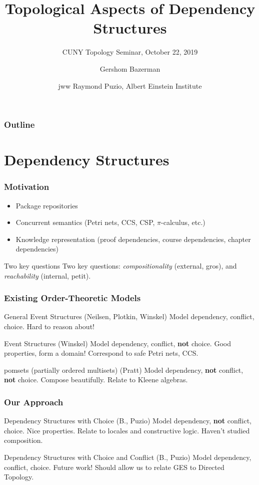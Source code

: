 \documentclass{beamer}
\title{Topological Aspects of Dependency Structures}
\subtitle{CUNY Topology Seminar, October 22, 2019}
\author{Gershom Bazerman}
\date{}
\institute{Awake Security}
\date[\today]{ \tiny{jww Raymond Puzio, Albert Einstein Institute}}
\begin{document}
\begin{frame}
		\titlepage
\end{frame}
\begin{frame}
\frametitle{Outline}
\tableofcontents
\end{frame}

\section{Dependency Structures}

\begin{frame}
\frametitle{Motivation}
\begin{itemize}
\item Package repositories
\item Concurrent semantics (Petri nets, CCS, CSP, \(\pi\)-calculus, etc.)
\item Knowledge representation (proof dependencies, course dependencies, chapter dependencies)
\end{itemize}
\begin{block}{Two key questions}
Two key questions: \textit{compositionality} (external, gros), and \textit{reachability} (internal, petit).
\end{block}
\end{frame}


\begin{frame}
\frametitle{Existing Order-Theoretic Models}
\begin{block}{General Event Structures (Neilsen, Plotkin, Winskel)}
Model dependency, conflict, choice. Hard to reason about!
\end{block}
\begin{block}{Event Structures (Winskel)}
Model dependency, conflict, \textbf{not} choice. Good properties, form a domain! Correspond to safe Petri nets, CCS.
\end{block}
\begin{block}{pomsets (partially ordered multisets) (Pratt)}
Model dependency, \textbf{not} conflict, \textbf{not} choice. Compose beautifully. Relate to Kleene algebras.
\end{block}
\end{frame}

\begin{frame}
\frametitle{Our Approach}
\begin{block}{Dependency Structures with Choice (B., Puzio)}
Model dependency, \textbf{not} conflict, choice. Nice properties. Relate to locales and constructive logic. Haven't studied composition.
\end{block}
\begin{block}{Dependency Structures with Choice and Conflict (B., Puzio)}
Model dependency, conflict, choice. Future work! Should allow us to relate GES to Directed Topology.
\end{block}
\end{frame}
\end{document}
